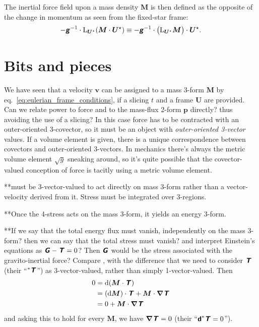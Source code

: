 \documentclass[\ifafour a4paper,12pt,\else a5paper,10pt,\fi%
onecolumn,oneside,article,%
british%
]{memoir}
\theoremstyle{remark}
\theoremstyle{innote}
\newcommand*{\mathte}[1]{\textbf{\textit{\textsf{#1}}}}
\newcommand*{\citep}{\parencites}
\newcommand*{\di}{\mathrm{d}}%
\renewcommand*{\|}{\nonscript\,\vert\nonscript\;\mathopen{}}
\newcommand*{\chap}{ch.}%
\newcommand*{\eqn}{eq.}%
\newcommand*{\Li}{\mathrm{L}}
\newcommand*{\yrr}{M}
\newcommand*{\yr}{\bm{\yrr}}
\newcommand*{\yjj}{p}
\newcommand*{\yj}{\bm{\yjj}}
\newcommand*{\yGG}{G}
\newcommand*{\yG}{\mathte{\yGG}}
\newcommand*{\yTTf}{T}
\newcommand*{\yTf}{\mathte{\yTTf}}
\newcommand*{\yvvt}{v}
\newcommand*{\yvt}{\bm{\yvvt}}
\newcommand*{\yFF}{U}
\newcommand*{\yF}{\bm{\yFF}}
\newcommand*{\yFi}{\yF^{\mathord{\star}}}
\newcommand*{\ygg}{g}
\newcommand*{\yg}{\mathte{\ygg}}
\newcommand*{\ygv}{\sqrt{\ygg}}
\newcommand*{\yDi}{\bm{\nabla}}
\begin{document}
The inertial force field upon a mass density $\yr$ is then defined as the
opposite of the change in momentum as seen from the fixed-star frame:
\begin{equation}
  \label{eq:inertial_force_fixed-stars}
  -\yg^{-1} \cdot \Li_{\yFi}(\yr\cdot\yFi) \equiv
  -\yg^{-1} \cdot \bigl(\Li_{\yFi}\yr\bigr)\cdot\yFi.
\end{equation}

\section{Bits and pieces}
\label{sec:bits}




We have seen that a velocity $\yvt$ can be
assigned to a mass 3-form $\yr$ by
\eqn~\eqref{eq:eulerian_frame_conditions}, if a slicing $t$ and a frame
$\yF$ are provided. Can we relate power to force and to the mass-flux
2-form $\yj$ directly? thus avoiding the use of a slicing? In this case
force has to be contracted with an outer-oriented 3-covector, so it must be
an object with \emph{outer-oriented 3-vector} values. If a volume element
is given, there is a unique correspondence between covectors and
outer-oriented 3-vectors. In mechanics there's always the metric volume
element $\ygv$ sneaking around, so it's quite possible that the
covector-valued conception of force is tacitly using a metric volume
element.


**must be 3-vector-valued to act directly on mass 3-form rather than a
vector-velocity derived from it. Stress must be integrated over 3-regions.

**Once the 4-stress acts on the mass 3-form, it yields an energy 3-form.

**If we say that the total energy flux must vanish, independently on the
mass 3-form? then we can say that the total stress must vanish? and
interpret Einstein's equations as $\yG-\yTf = 0$? Then $\yG$ would be the
stress associated with the gravito-inertial force? Compare
\citep[\chap~15]{misneretal1970_r2003}, with the difference that we need to
consider $\yTf$ (their \enquote{$^*\yTf$}) as
3-vector-valued, rather than simply 1-vector-valued. Then
\begin{equation}
  \label{eq:why_4stress_zero}
  \begin{split}
    0 &=   \di(\yr \cdot \yTf) \\
    &= (\di\yr)\cdot\yTf + \yr \cdot \yDi\yTf \\
    &= 0 + \yr \cdot \yDi\yTf
  \end{split}
\end{equation}
and asking this to hold for every $\yr$, we have $\yDi\yTf = 0$ (their
\enquote{$\bm{\mathsf{d}}^*\yTf=0$}).
\end{document}
